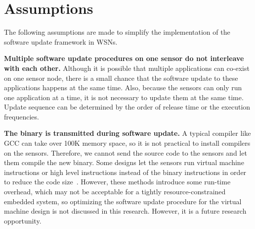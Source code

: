 %
%
%
%



\section{Assumptions}
The following assumptions are made to simplify the implementation of the software update framework in WSNs.

\textbf{Multiple software update procedures on one sensor do not interleave with each other.}
Although it is possible that multiple applications can co-exist on one sensor node, there is a small chance that the 
software update to these applications happens at the same time.
Also, because the sensors can only run one application at a time, it is not necessary to update them at the same time.
Update sequence can be determined by the order of release time or the execution frequencies.

\textbf{The binary is transmitted during software update.}
A typical compiler like GCC can take over 100K memory space, so it is not practical to install compilers on the sensors.
Therefore, we cannot send the source code to the sensors and let them compile the new binary.
Some designs let the sensors run virtual machine instructions or high level instructions instead of the binary 
instructions in order to reduce the code size~\cite{mate,related:dynamic1, related:dynamic2}. However, these methods 
introduce some run-time overhead, which may not be acceptable for a tightly resource-constrained embedded system, so 
optimizing the software update procedure for the virtual machine design is not discussed in this research. However, it 
is a future research opportunity.


